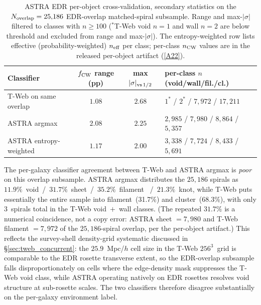 \documentclass[twocolumn,linenumbers]{aastex702}
\newcommand{\repoBase}{https://github.com/Hubify-Projects/bigbounce/blob/main}
\begin{document}
\begin{table}[!htb]
\caption{ASTRA EDR per-object cross-validation, secondary statistics on
the $N_{\rm overlap} = 25{,}186$ EDR-overlap matched-spiral subsample.
Range and max-$|\sigma|$ filtered to classes with $n \geq 100$
($^*$T-Web void $n=1$ and wall $n=2$ are below threshold and excluded
from range and max-$|\sigma|$). The entropy-weighted row lists
effective (probability-weighted) $n_{\rm eff}$ per class; per-class
$n_{\rm CW}$ values are in the released per-object artifact
(\href{\repoBase/pipelines/p5\_desi\_chirality/results/analysis\_astra\_per\_object/cw\_fraction\_by\_env\_astra.csv}{[A22]}).}
\label{tab:astra_headline}
\centering
\begin{ruledtabular}
\begin{tabular}{lccl}
Classifier & $f_{\rm CW}$ range (pp) & max $|\sigma|_{\rm vs\,1/2}$ &
per-class $n$ (void/wall/fil./cl.) \\
\hline
T-Web on same overlap         & $1.08$ & $2.68$ & $1^*$ / $2^*$ / $7{,}972$ / $17{,}211$ \\
ASTRA argmax                  & $2.08$ & $2.25$ & $2{,}985$ / $7{,}980$ / $8{,}864$ / $5{,}357$ \\
ASTRA entropy-weighted        & $1.17$ & $2.00$ & $3{,}338$ / $7{,}724$ / $8{,}433$ / $5{,}691$ \\
\end{tabular}
\end{ruledtabular}
\end{table}

The per-galaxy classifier agreement between T-Web and ASTRA argmax is
\emph{poor} on this overlap subsample. ASTRA argmax distributes the
$25{,}186$ spirals as $11.9\%$~void~/~$31.7\%$~sheet~/~$35.2\%$~filament
~/~$21.3\%$~knot, while T-Web puts essentially the entire sample into
filament~(31.7\%) and cluster~(68.3\%), with only $3$~spirals total in
the T-Web void~$+$~wall classes. (The repeated $31.7\%$ is a
numerical coincidence, not a copy error: ASTRA sheet $= 7{,}980$ and
T-Web filament $= 7{,}972$ of the $25{,}186$-spiral overlap, per the
per-object artifact.) This reflects the survey-shell
density-grid systematic discussed in
\S\ref{sec:tweb_concurrent}: the $25.9$~Mpc/$h$ cell size in the T-Web
$256^{3}$~grid is comparable to the EDR rosette transverse extent, so
the EDR-overlap subsample falls disproportionately on cells where the
edge-density mask suppresses the T-Web void class, while ASTRA
operating natively on EDR rosettes resolves void structure at
sub-rosette scales. The two classifiers therefore disagree
substantially on the per-galaxy environment label.
\end{document}
